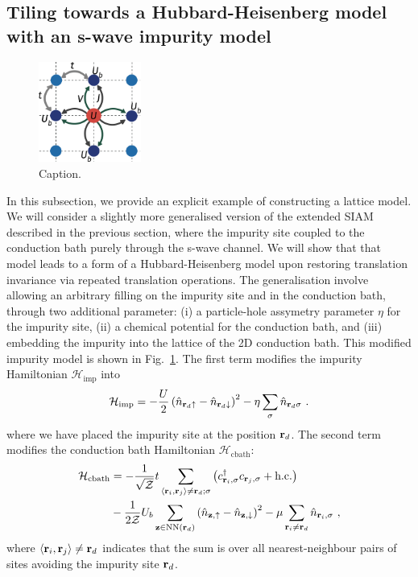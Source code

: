 \documentclass[reprint,hidelinks]{revtex4-2}
\begin{document}
\subsection{Tiling towards a Hubbard-Heisenberg model with an s-wave impurity model}
\begin{figure}[htpb]
	\centering
	\includegraphics[width=0.3\textwidth]{pWaveEsiam.pdf}
	\caption{Caption.}
	\label{pWaveEsiam}
\end{figure}
In this subsection, we provide an explicit example of constructing a lattice model. We will consider a slightly more generalised version of the extended SIAM described in the previous section, where the impurity site coupled to the conduction bath purely through the s-wave channel. We will show that that model leads to a form of a Hubbard-Heisenberg model upon restoring translation invariance via repeated translation operations. The generalisation involve allowing an arbitrary filling on the impurity site and in the conduction bath, through two additional parameter: (i) a particle-hole assymetry parameter \(\eta\) for the impurity site, (ii) a chemical potential for the conduction bath, and (iii) embedding the impurity into the lattice of the 2D conduction bath. This modified impurity model is shown in Fig.~\ref{pWaveEsiam}. The first term modifies the impurity Hamiltonian \(\mathcal{H}_\text{imp}\) into
\begin{equation}\begin{aligned}\label{onsiteHamiltonian}
	\mathcal{H}_\text{imp} = -\frac{U}{2}\left(\hat n_{{\bf r}_d \uparrow} - \hat n_{{\bf r}_d \downarrow} \right)^2 - \eta\sum_\sigma \hat n_{{\bf r}_d\sigma}~.
\end{aligned}\end{equation}
where we have placed the impurity site at the position \({\bf r}_d\). The second term modifies the conduction bath Hamiltonian \(\mathcal{H}_\text{cbath}\):
\begin{equation}\begin{aligned}\label{bathHamiltonian}
	\mathcal{H}_\text{cbath} &= -\frac{1}{\sqrt\mathcal{Z}}t\sum_{\left<{\bf r}_i, {\bf r}_j\right>\neq{\bf r}_d;\sigma}\left(c^\dagger_{{\bf r}_i,\sigma}c_{{\bf r}_j,\sigma} + \text{h.c.}\right)\\
							 &- \frac{1}{2 \mathcal{Z}}U_b\sum_{{\bf z}\in\text{NN}({\bf r}_d)}\left(\hat n_{{\bf z}, \uparrow} - \hat n_{{\bf z}, \downarrow}\right)^2 - \mu \sum_{{\bf r}_i \neq {\bf r}_d}\hat n_{{\bf r}_i,\sigma}~,
\end{aligned}\end{equation}
where \(\left<{\bf r}_i, {\bf r}_j\right>\neq {\bf r}_d\) indicates that the sum is over all nearest-neighbour pairs of sites avoiding the impurity site \({\bf r}_d\).
\end{document}
